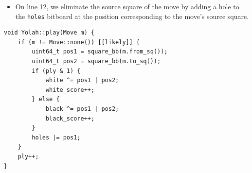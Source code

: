 \documentclass[12pt,a4paper,twoside,openright]{book}
\begin{document}
\begin{itemize}
\begin{itemize}
\item If it is black's turn to play, we proceed similarly, but for the black player's \texttt{black} bitboard on line 9, and we increase their score on line 10.

\end{itemize}

\item On line 12, we eliminate the source square of the move by adding a hole to the \texttt{holes} bitboard at the position corresponding to the move's source square.

\end{itemize}

\begin{mdframed}[skipabove=\baselineskip,hidealllines=true]
\begin{verbatim}
void Yolah::play(Move m) {
    if (m != Move::none()) [[likely]] {                    
        uint64_t pos1 = square_bb(m.from_sq());
        uint64_t pos2 = square_bb(m.to_sq());
        if (ply & 1) {
            white ^= pos1 | pos2;
            white_score++;
        } else {
            black ^= pos1 | pos2;
            black_score++;
        }
        holes |= pos1;
    }
    ply++;
}
\end{verbatim}
\label{lst:making_moves}
\end{mdframed}
\end{document}
